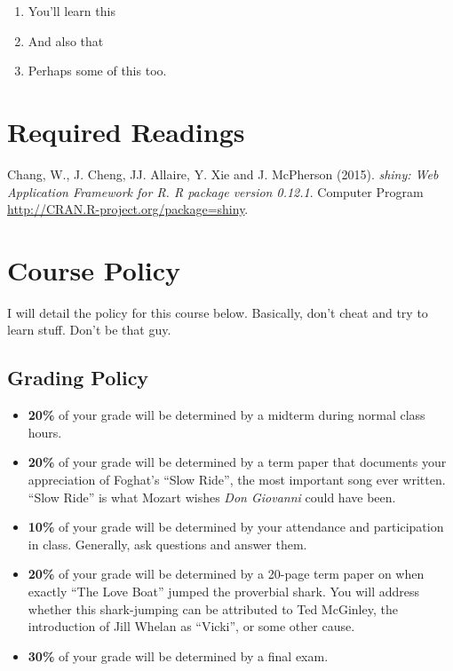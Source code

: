 \documentclass[11pt,]{article}
\begin{document}
\begin{enumerate}
\def\labelenumi{\arabic{enumi}.}
\item
  You'll learn this
\item
  And also that
\item
  Perhaps some of this too.
\end{enumerate}

\section{Required Readings}\label{required-readings}

 Chang, W., J. Cheng, JJ. Allaire, Y. Xie and J.
McPherson (2015).
\emph{shiny: Web Application Framework for R. R package version 0.12.1}.
Computer Program \url{http://CRAN.R-project.org/package=shiny}.

\section{Course Policy}\label{course-policy}

I will detail the policy for this course below. Basically, don't cheat
and try to learn stuff. Don't be that guy.

\subsection{Grading Policy}\label{grading-policy}

\begin{itemize}
\item
  \textbf{20\%} of your grade will be determined by a midterm during
  normal class hours.
\item
  \textbf{20\%} of your grade will be determined by a term paper that
  documents your appreciation of Foghat's ``Slow Ride'', the most
  important song ever written. ``Slow Ride'' is what Mozart wishes
  \emph{Don Giovanni} could have been.
\item
  \textbf{10\%} of your grade will be determined by your attendance and
  participation in class. Generally, ask questions and answer them.
\item
  \textbf{20\%} of your grade will be determined by a 20-page term paper
  on when exactly ``The Love Boat'' jumped the proverbial shark. You
  will address whether this shark-jumping can be attributed to Ted
  McGinley, the introduction of Jill Whelan as ``Vicki'', or some other
  cause.
\item
  \textbf{30\%} of your grade will be determined by a final exam.
\end{itemize}
\end{document}
